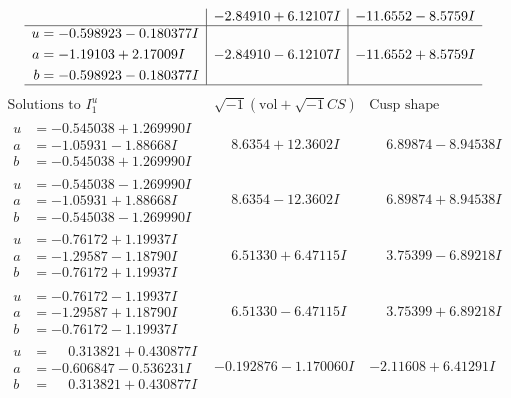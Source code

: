 \documentclass[1p]{elsarticle_modified}
\theoremstyle{definition}
\newcommand{\I}{\sqrt{-1}}
\begin{document}
$$\begin{array}{c|c|c}
 & -2.84910 + 6.12107 I & -11.6552 - 8.5759 I \\ \hline\begin{aligned}
u &= -0.598923 - 0.180377 I \\
a &= -1.19103 + 2.17009 I \\
b &= -0.598923 - 0.180377 I\end{aligned}
 & -2.84910 - 6.12107 I & -11.6552 + 8.5759 I\\
 \hline 
 \end{array}$$\newpage$$\begin{array}{c|c|c}  
\text{Solutions to }I^u_{1}& \I (\text{vol} + \sqrt{-1}CS) & \text{Cusp shape}\\
 \hline 
\begin{aligned}
u &= -0.545038 + 1.269990 I \\
a &= -1.05931 - 1.88668 I \\
b &= -0.545038 + 1.269990 I\end{aligned}
 & \phantom{-}8.6354 + 12.3602 I & \phantom{-}6.89874 - 8.94538 I \\ \hline\begin{aligned}
u &= -0.545038 - 1.269990 I \\
a &= -1.05931 + 1.88668 I \\
b &= -0.545038 - 1.269990 I\end{aligned}
 & \phantom{-}8.6354 - 12.3602 I & \phantom{-}6.89874 + 8.94538 I \\ \hline\begin{aligned}
u &= -0.76172 + 1.19937 I \\
a &= -1.29587 - 1.18790 I \\
b &= -0.76172 + 1.19937 I\end{aligned}
 & \phantom{-}6.51330 + 6.47115 I & \phantom{-}3.75399 - 6.89218 I \\ \hline\begin{aligned}
u &= -0.76172 - 1.19937 I \\
a &= -1.29587 + 1.18790 I \\
b &= -0.76172 - 1.19937 I\end{aligned}
 & \phantom{-}6.51330 - 6.47115 I & \phantom{-}3.75399 + 6.89218 I \\ \hline\begin{aligned}
u &= \phantom{-}0.313821 + 0.430877 I \\
a &= -0.606847 - 0.536231 I \\
b &= \phantom{-}0.313821 + 0.430877 I\end{aligned}
 & -0.192876 - 1.170060 I & -2.11608 + 6.41291 I \\ \hline\begin{aligned}

\end{aligned}
\end{array}$$
\end{document}
